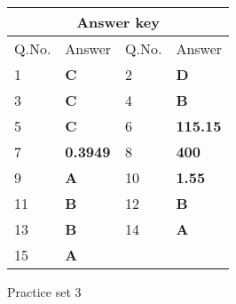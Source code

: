 \setlength\arrayrulewidth{1pt}
\begin{table}[H]
	\centering
	\begin{tabular}{|p{1.5cm}|p{1.5cm}||p{1.5cm}|p{1.5cm}|}
		\hline
		\multicolumn{4}{|c|}{\textbf{Answer key}}\\\hline\hline
		\rowcolor{ocrel}Q.No.&Answer&Q.No.&Answer\\\hline
		1&\textbf{C} &2&\textbf{D}\\\hline 
		3&\textbf{C} &4&\textbf{B} \\\hline
		5&\textbf{C} &6&\textbf{115.15} \\\hline
		7&\textbf{0.3949}&8&\textbf{400}\\\hline
		9&\textbf{A}&10&\textbf{1.55}\\\hline
		11&\textbf{B}&12&\textbf{B}\\\hline
		13&\textbf{B}&14&\textbf{A}\\\hline
		15&\textbf{A}& &\\\hline
	\end{tabular}
\end{table}
\newpage
\begin{abox}
	Practice set 3
\end{abox}
